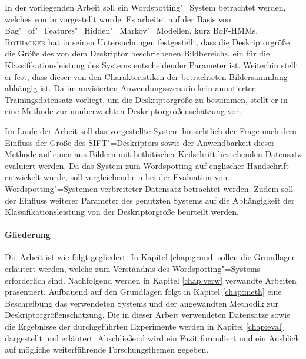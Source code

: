 In der vorliegenden Arbeit soll ein Wordspotting"=System betrachtet werden, welches von 
in \cite{LDiss} vorgestellt wurde. Es arbeitet auf der Basis von Bag"=of"=Features"=Hidden"=Markov"=Modellen, kurz
BoF-HMMs.
%
\textsc{Rothacker} hat in seinen Untersuchungen festgestellt, dass die Deskriptorgröße, die Größe des von dem 
Deskriptor beschriebenen Bildbereichs, ein für die Klassifikationsleistung des Systems entscheidender Parameter ist. 
Weiterhin stellt er fest, dass dieser von den Charakteristiken der betrachteten Bildersammlung abhängig ist. 
Da im anvisierten Anwendungsszenario kein annotierter Trainingsdatensatz vorliegt, um die Deskriptorgröße zu bestimmen, 
stellt er in \cite[Kap. 5.4.1]{LDiss} eine Methode zur unüberwachten Deskriptorgrößenschätzung vor.



Im Laufe der Arbeit soll das vorgestellte System hinsichtlich der Frage nach dem Einfluss der Größe des SIFT"=Deskriptors 
sowie der Anwendbarkeit dieser Methode auf einen aus Bildern mit hethitischer Keilschrift bestehenden Datensatz evaluiert werden. 
Da das System zum Wordspotting auf englischer Handschrift entwickelt wurde, soll vergleichend ein bei der Evaluation von 
Wordspotting"=Systemen verbreiteter Datensatz betrachtet werden. Zudem soll der Einfluss weiterer Parameter des genutzten 
Systems auf die Abhängigkeit der Klassifikationsleistung von der Deskriptorgröße beurteilt werden.


\paragraph{Gliederung}

Die Arbeit ist wie folgt gegliedert: In Kapitel \ref{chap:grund} sollen die Grundlagen erläutert werden, welche zum Verständnis des Wordspotting"=Systems erforderlich sind. Nachfolgend werden in Kapitel \ref{chap:verw} verwandte Arbeiten präsentiert. Aufbauend auf den Grundlagen folgt in Kapitel \ref{chap:meth} eine Beschreibung das verwendeten Systems und der angewandten Methodik zur Deskriptorgrößenschätzung. Die in dieser Arbeit verwendeten Datensätze sowie die Ergebnisse der durchgeführten Experimente werden in Kapitel \ref{chap:eval} dargestellt und erläutert. Abschließend wird ein Fazit formuliert und ein Ausblick auf mögliche weiterführende Forschungsthemen gegeben.




